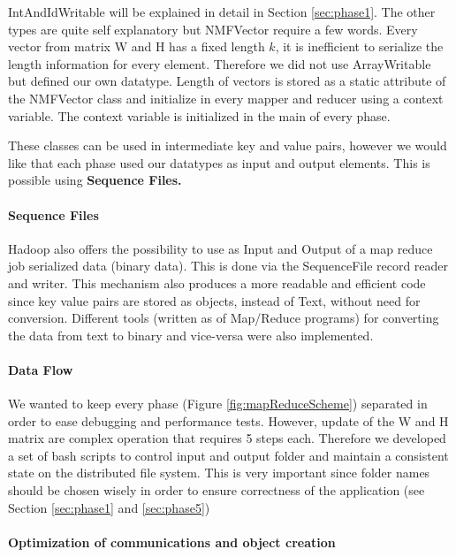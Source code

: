 \documentclass[a4paper,12pt]{article}
\begin{document}
IntAndIdWritable will be explained in detail in Section \ref{sec:phase1}.
The other types are quite self explanatory but NMFVector require a few words.
Every vector from matrix W and H has a fixed length $k$, it is inefficient to serialize the length information for every element.
Therefore we did not use ArrayWritable but defined our own datatype.
Length of vectors is stored as a static attribute of the NMFVector class and initialize in every mapper and reducer using a context variable.
The context variable is initialized in the main of every phase.

These classes can be used in intermediate key and value pairs, however we would like that each phase used our datatypes as input and output elements.
This is possible using \textbf{Sequence Files.}

\paragraph{Sequence Files}

Hadoop also offers the possibility to use as Input and Output of a map reduce job serialized data (binary data). 
This is done via the SequenceFile record reader and writer.
This mechanism also produces a more readable and efficient code since key value pairs are stored as objects, instead of Text, without need for conversion. 
Different tools (written as of Map/Reduce programs) for converting the data from text to binary and vice-versa were also implemented.

\paragraph{Data Flow}

We wanted to keep every phase (Figure \ref{fig:mapReduceScheme}) separated in order to ease debugging and performance tests.
However, update of the W and H matrix are complex operation that requires 5 steps each.
Therefore we developed a set of bash scripts to control input and output folder and maintain a consistent state on the distributed file system.
This is very important since folder names should be chosen wisely in order to ensure correctness of the application (see Section \ref{sec:phase1} and \ref{sec:phase5})

\paragraph{Optimization of communications and object creation}
\end{document}
